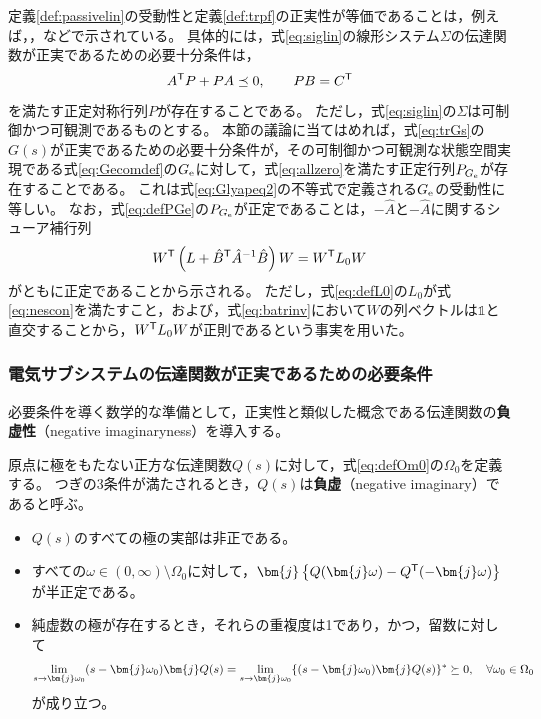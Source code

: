 \documentclass[tombow,dvipdfmx]{corona-a5-1.1}
\begin{document}
定義\ref{def:passivelin}の受動性と定義\ref{def:trpf}の正実性が等価であることは，例えば，\cite[Lemma 3]{kottenstette2010relationships}，\cite[Theorem 5.31]{antoulas2005approximation}などで示されている。
具体的には，式\ref{eq:siglin}の線形システム$\Sigma$の伝達関数が正実であるための必要十分条件は，
\[
A^{\sf T} P  + PA \preceq 0 ,\qquad PB = C^{\sf T}
\]
を満たす正定対称行列$P$が存在することである。
ただし，式\ref{eq:siglin}の$\Sigma$は可制御かつ可観測であるものとする。
本節の議論に当てはめれば，式\ref{eq:trGs}の$G(s)$が正実であるための必要十分条件が，その可制御かつ可観測な状態空間実現である式\ref{eq:Gecomdef}の$G_{\rm e}$に対して，式\ref{eq:allzero}を満たす正定行列$P_{G_{\rm e}}$が存在することである。
これは式\ref{eq:Glyapeq2}の不等式で定義される$G_{\rm e}$の受動性に等しい。
なお，式\ref{eq:defPGe}の$P_{G_{\rm e}}$が正定であることは，$-\hat{A}$と$-\hat{A}$に関するシューア補行列
\[
W^{\sf T} \left(L+\hat{B}^{\sf T} \hat{A}^{-1} \hat{B} \right) W
=  W^{\sf T} L_0 W
\]
がともに正定であることから示される。
ただし，式\ref{eq:defL0}の$L_0$が式\ref{eq:nescon}を満たすこと，および，式\ref{eq:batrinv}において$W$の列ベクトルは$\mathds{1}$と直交することから，$W^{\sf T} L_0 W$が正則であるという事実を用いた。




\subsubsection{電気サブシステムの伝達関数が正実であるための必要条件}


必要条件を導く数学的な準備として，正実性と類似した概念である伝達関数の\textbf{負虚性}（negative imaginaryness）を導入する\cite{petersen2010feedback,xiong2010negative}。

\begin{定義}[伝達関数の負虚性]
\label{def:trni}
原点に極をもたない正方な伝達関数$Q(s)$に対して，式\ref{eq:defOm0}の$\Omega_0$を定義する。
つぎの3条件が満たされるとき，$Q(s)$は\textbf{負虚}（negative imaginary）であると呼ぶ。
\begin{itemize}
\item $Q(s)$のすべての極の実部は非正である。
\item すべての$\omega \in (0,\infty)\setminus \Omega_0$に対して，$\bm{j}\left\{Q(\bm{j} \omega) - Q^{\sf T}(-\bm{j} \omega) \right\}$が半正定である。
\item 純虚数の極が存在するとき，それらの重複度は1であり，かつ，留数に対して
\begin{align*}
\lim_{s \rightarrow \bm{j} \omega_0} (s-\bm{j} \omega_0) \bm{j} Q(s) = 
\lim_{s\rightarrow \bm{j} \omega_0} \{ (s-\bm{j} \omega_0) \bm{j} Q(s)\}^{\sf *}\succeq 0
,\quad
\forall \omega_0 \in \Omega_0
\end{align*}
が成り立つ。
\end{itemize}
\end{定義}
\end{document}
